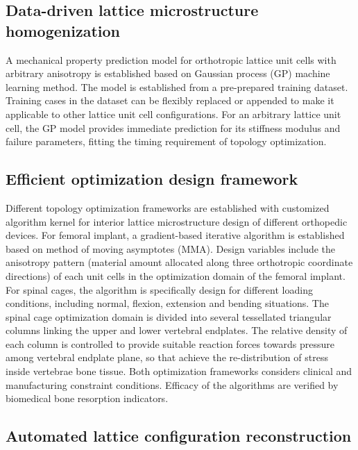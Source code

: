 \documentclass[12pt]{extbook}
\begin{document}
\subsection{Data-driven lattice microstructure homogenization}

A mechanical property prediction model for orthotropic lattice unit cells with arbitrary anisotropy is established based on Gaussian process (GP) machine learning method. The model is established from a pre-prepared training dataset. Training cases in the dataset can be flexibly replaced or appended to make it applicable to other lattice unit cell configurations. For an arbitrary lattice unit cell, the GP model provides immediate prediction for its stiffness modulus and failure parameters, fitting the timing requirement of topology optimization.\\

\subsection{Efficient optimization design framework}

Different topology optimization frameworks are established with customized algorithm kernel for interior lattice microstructure design of different orthopedic devices. For femoral implant, a gradient-based iterative algorithm is established based on method of moving asymptotes (MMA). Design variables include the anisotropy pattern (material amount allocated along three orthotropic coordinate directions) of each unit cells in the optimization domain of the femoral implant. For spinal cages, the algorithm is specifically design for different loading conditions, including normal, flexion, extension and bending situations. The spinal cage optimization domain is divided into several tessellated triangular columns linking the upper and lower vertebral endplates. The relative density of each column is controlled to provide suitable reaction forces towards pressure among vertebral endplate plane, so that achieve the re-distribution of stress inside vertebrae bone tissue. Both optimization frameworks considers clinical and manufacturing constraint conditions.  Efficacy of the algorithms are verified by biomedical bone resorption indicators.\\

\subsection{Automated lattice configuration reconstruction}
\end{document}
